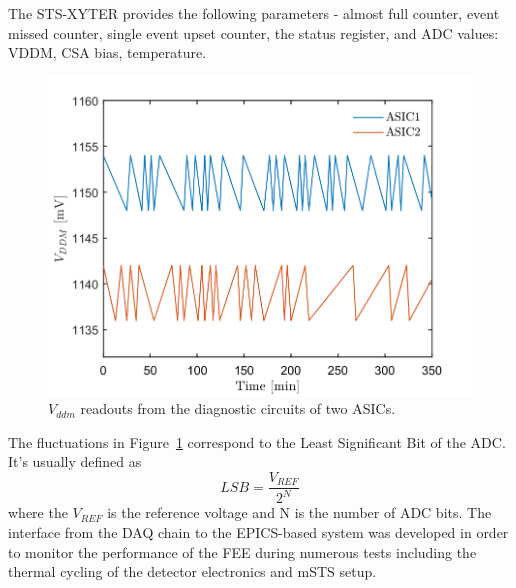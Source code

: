 The STS-XYTER provides the following parameters - almost full counter, event missed counter, single event upset counter, the status register, and \gls{ADC} values: VDDM, \gls{CSA} bias, temperature. 

\begin{figure}[!h]
    \centering
    \includegraphics[width=0.65\columnwidth]{Chapter4/images/FEB.png}
    \caption{$V_{ddm}$ readouts from the diagnostic circuits of two ASICs.}
    \label{fig:vddm_first}
\end{figure}
The fluctuations in Figure~\ref{fig:vddm_first} correspond  to the Least Significant Bit of the \gls{ADC}. It's usually defined as
\begin{equation}
    LSB = \frac{V_{REF}}{2^{N}}
\end{equation}
where the $V_{REF}$ is the reference voltage and N is the number of ADC bits. 
The interface from the \gls{DAQ} chain to the \gls{EPICS}-based system was developed in order to monitor the performance of the \gls{FEE} during numerous tests including the thermal cycling of the detector electronics and \gls{mSTS} setup. 

